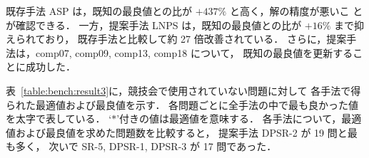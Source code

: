 既存手法 ASP は，既知の最良値との比が $+437\%$ と高く，解の精度が悪いこ
とが確認できる．
一方，提案手法 LNPS は，既知の最良値との比が $+16\%$ まで抑えられており，
既存手法と比較して約 27 倍改善されている．
さらに，提案手法は，comp07, comp09, comp13, comp18 について，
既知の最良値を更新することに成功した．

表~\ref{table:bench:result3}に，競技会で使用されていない問題に対して
各手法で得られた最適値および最良値を示す．
各問題ごとに全手法の中で最も良かった値を太字で表している．
`$\ast$'付きの値は最適値を意味する．
各手法について，最適値および最良値を求めた問題数を比較すると，
提案手法 \textsf{DPSR-2} が 19 問と最も多く，
次いで \textsf{SR-5, DPSR-1, DPSR-3} が 17 問であった．



